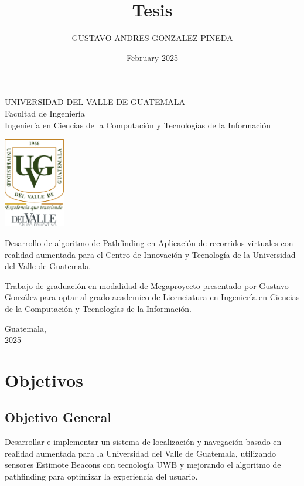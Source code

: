 \documentclass{article}
\title{Tesis}
\author{GUSTAVO ANDRES GONZALEZ PINEDA}
\date{February 2025}
\begin{document}
\begin{center}
\begin{doublespace}
    \Large{UNIVERSIDAD DEL VALLE DE GUATEMALA}\\
    Facultad de Ingeniería \\
    Ingeniería en Ciencias de la Computación y Tecnologías de la Información 

    \vspace{15mm} 
    \includegraphics[width=0.2\textwidth]{images/Uvg_logo.jpg}

    \vspace{15mm} 
    {\Large Desarrollo de algoritmo de Pathfinding en Aplicación de recorridos virtuales con realidad aumentada para el Centro de Innovación y Tecnología de la Universidad del Valle de Guatemala.}

    \vspace{10mm} 
    {\Large Trabajo de graduación en modalidad de Megaproyecto presentado por Gustavo González
    para optar al grado academico de Licenciatura en Ingeniería en Ciencias de la Computación y Tecnologías de la Información.}

    \vspace{10mm} 
    {\Large Guatemala, \\ 2025}
    
\end{doublespace}
\end{center}

\newpage
\section{Objetivos}
\subsection{Objetivo General}
{\justify Desarrollar e implementar un sistema de localización y navegación basado en realidad aumentada para la Universidad 
del Valle de Guatemala, utilizando sensores Estimote Beacons con tecnología UWB y mejorando el algoritmo de pathfinding para 
optimizar la experiencia del usuario.}
\end{document}

